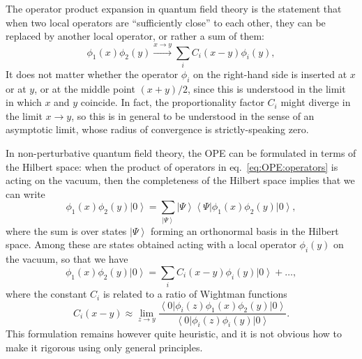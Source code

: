 \documentclass[a4paper,12pt]{article}
\newcommand{\ket}[1]{\left| #1 \right\rangle}
\newcommand{\bra}[1]{\left\langle #1 \right|}
\numberwithin{equation}{section}
\begin{document}
The operator product expansion in quantum field theory is the statement that when two local operators are ``sufficiently close'' to each other, they can be replaced by another local operator, or rather a sum of them:
\begin{equation}
	\phi_1(x) \phi_2(y) \xrightarrow{x \to y} \sum_i C_i(x-y) \phi_i(y),
	\label{eq:OPE:operators}
\end{equation}
It does not matter whether the operator $\phi_i$ on the right-hand side is inserted at $x$ or at $y$, or at the middle point $(x+y)/2$, since this is understood in the limit in which $x$ and $y$ coincide. In fact, the proportionality factor $C_i$ might diverge in the limit $x \to y$, so this is in general to be understood in the sense of an asymptotic limit, whose radius of convergence is strictly-speaking zero.

In non-perturbative quantum field theory, the OPE can be formulated in terms of the Hilbert space: when the product of operators in eq.~\eqref{eq:OPE:operators} is acting on the vacuum, then the completeness of the Hilbert space implies that we can write
\begin{equation}
	\phi_1(x) \phi_2(y) \ket{0}
	= \sum_{\ket{\Psi}} \ket{\Psi}
	\bra{\Psi} \phi_1(x) \phi_2(y) \ket{0},
\end{equation}
where the sum is over states $\ket{\Psi}$ forming an orthonormal basis in the Hilbert space. Among these are states obtained acting with a local operator $\phi_i(y)$ on the vacuum, so that we have 
\begin{equation}
	\phi_1(x) \phi_2(y) \ket{0}
	= \sum_{i} C_i(x-y) \phi_i(y) \ket{0} + \ldots,
\end{equation}
where the constant $C_i$ is related to a ratio of Wightman functions
\begin{equation}
	C_i(x-y) \approx \lim_{z \to y}
	\frac{\bra{0} \phi_i(z) \phi_1(x) \phi_2(y) \ket{0}}
	{\bra{0} \phi_i(z) \phi_i(y) \ket{0}}.
\end{equation}
This formulation remains however quite heuristic, and it is not obvious how to make it rigorous using only general principles.
\end{document}
